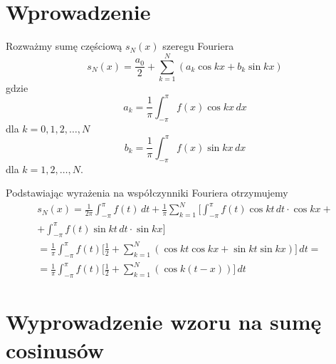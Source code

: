 \section{Wprowadzenie}\label{sec1}



Rozważmy sumę częściową $s_{N}(x)$ szeregu Fouriera
\begin{equation}
s_{N}(x)
=
\frac{a_{0}}{2} + \sum_{k=1}^{N} (a_{k} \cos kx + b_{k} \sin kx)
\end{equation}
gdzie
\begin{equation}
a_{k} = \frac{1}{\pi} \int_{-\pi}^{\pi} f(x) \cos kx \, dx
\end{equation}
dla $k = 0, 1, 2, \ldots, N$
\begin{equation}
b_{k} = \frac{1}{\pi} \int_{-\pi}^{\pi} f(x) \sin kx \, dx
\end{equation}
dla $k = 1, 2, \ldots, N$\@.

Podstawiając wyrażenia na współczynniki Fouriera otrzymujemy
\begin{eqnarray}
\label{eq:F_coefficients}
s_{N}(x)
=
\frac{1}{2\pi} \int_{-\pi}^{\pi} f(t) \, dt
+
\frac{1}{\pi} \sum_{k=1}^{N} \Big[\int_{-\pi}^{\pi} f(t) \cos kt \, dt \cdot \cos kx + \\ \nonumber
                               +   \int_{-\pi}^{\pi} f(t) \sin kt \, dt \cdot \sin kx 
\Big]                                                                                  \\ \nonumber
=
\frac{1}{\pi} \int_{-\pi}^{\pi} f(t) \Big[ \frac{1}{2} + \sum_{k=1}^{N} (\cos kt \cos kx + \sin kt \sin kx) \Big] \, dt = \\ \nonumber
=
\frac{1}{\pi} \int_{-\pi}^{\pi} f(t) \Big[ \frac{1}{2} + \sum_{k=1}^{N} (\cos k(t - x)) \Big] \, dt 
\end{eqnarray}




\section{Wyprowadzenie wzoru na sumę cosinusów}\label{sec2}




